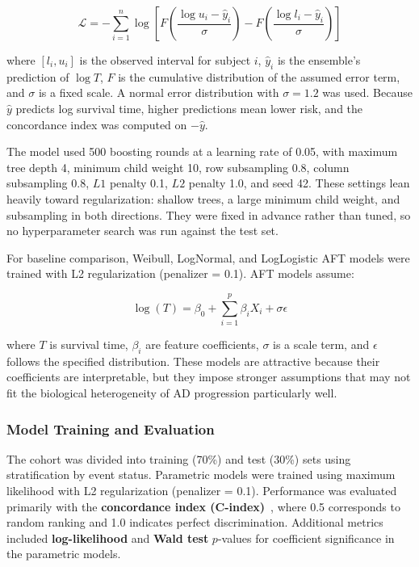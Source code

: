 \documentclass[blue]{ludusofficial}  %
\begin{document}
\begin{equation}
    \mathcal{L} = -\sum_{i=1}^{n} \log \left[ F\!\left(\frac{\log u_i - \hat{y}_i}{\sigma}\right) - F\!\left(\frac{\log l_i - \hat{y}_i}{\sigma}\right) \right]
\end{equation}

where $[l_i, u_i]$ is the observed interval for subject $i$, $\hat{y}_i$ is the ensemble's prediction of $\log T$, $F$ is the cumulative distribution of the assumed error term, and $\sigma$ is a fixed scale. A normal error distribution with $\sigma = 1.2$ was used. Because $\hat{y}$ predicts log survival time, higher predictions mean lower risk, and the concordance index was computed on $-\hat{y}$.

The model used 500 boosting rounds at a learning rate of 0.05, with maximum tree depth 4, minimum child weight 10, row subsampling 0.8, column subsampling 0.8, $L1$ penalty 0.1, $L2$ penalty 1.0, and seed 42. These settings lean heavily toward regularization: shallow trees, a large minimum child weight, and subsampling in both directions. They were fixed in advance rather than tuned, so no hyperparameter search was run against the test set.

For baseline comparison, Weibull, LogNormal, and LogLogistic AFT models were trained with L2 regularization (penalizer = 0.1). AFT models assume:

\begin{equation}
    \log(T) = \beta_0 + \sum_{i=1}^{p} \beta_i X_i + \sigma \epsilon
\end{equation}

where $T$ is survival time, $\beta_i$ are feature coefficients, $\sigma$ is a scale term, and $\epsilon$ follows the specified distribution. These models are attractive because their coefficients are interpretable, but they impose stronger assumptions that may not fit the biological heterogeneity of AD progression particularly well.

\subsubsection{Model Training and Evaluation}

The cohort was divided into training (70\%) and test (30\%) sets using stratification by event status. Parametric models were trained using maximum likelihood with L2 regularization (penalizer = 0.1). Performance was evaluated primarily with the \textbf{concordance index (C-index)}~\cite{uno2011cstat}, where 0.5 corresponds to random ranking and 1.0 indicates perfect discrimination. Additional metrics included \textbf{log-likelihood} and \textbf{Wald test} $p$-values for coefficient significance in the parametric models.
\end{document}
